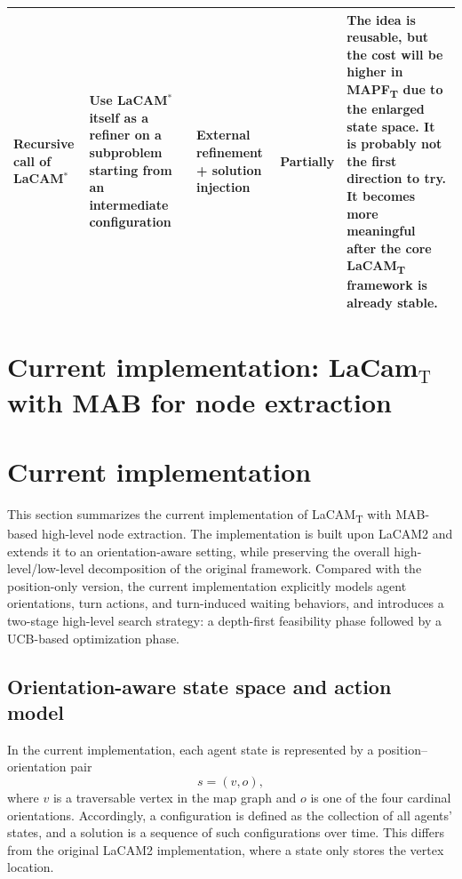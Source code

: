 \documentclass[lettersize,journal]{IEEEtran}
\begin{document}
\begin{table}[t]
\begin{tabularx}{\textwidth}{p{2.7cm} p{3.4cm} p{3.0cm} p{3.0cm} X}
\addlinespace

Recursive call of LaCAM$^{*}$
& Use LaCAM$^{*}$ itself as a refiner on a subproblem starting from an intermediate configuration 
& External refinement + solution injection 
& Partially 
& The idea is reusable, but the cost will be higher in MAPF\textsubscript{T} due to the enlarged state space. It is probably not the first direction to try. It becomes more meaningful after the core LaCAM\textsubscript{T} framework is already stable. \\

\bottomrule
\end{tabularx}
\end{table}


\section{Current implementation: LaCam$_{\text{T}}$ with MAB for node extraction}

\section{Current implementation}
\label{sec:current_implementation}

This section summarizes the current implementation of LaCAM\textsubscript{T} with MAB-based high-level node extraction. The implementation is built upon LaCAM2 and extends it to an orientation-aware setting, while preserving the overall high-level/low-level decomposition of the original framework. Compared with the position-only version, the current implementation explicitly models agent orientations, turn actions, and turn-induced waiting behaviors, and introduces a two-stage high-level search strategy: a depth-first feasibility phase followed by a UCB-based optimization phase. 

\subsection{Orientation-aware state space and action model}
\label{subsec:impl_state_action}

In the current implementation, each agent state is represented by a position--orientation pair
\[
s=(v,o),
\]
where $v$ is a traversable vertex in the map graph and $o$ is one of the four cardinal orientations. Accordingly, a configuration is defined as the collection of all agents' states, and a solution is a sequence of such configurations over time. This differs from the original LaCAM2 implementation, where a state only stores the vertex location. 
\end{document}
